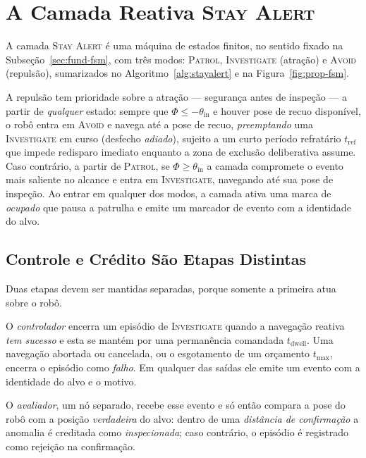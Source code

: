 \section{A Camada Reativa \textsc{Stay Alert}}
\label{sec:prop-stayalert}

A camada \textsc{Stay Alert} é uma máquina de estados finitos, no sentido fixado na
Subseção~\ref{sec:fund-fsm}, com três modos:
\textsc{Patrol}, \textsc{Investigate} (atração) e \textsc{Avoid} (repulsão),
sumarizados no Algoritmo~\ref{alg:stayalert} e na Figura~\ref{fig:prop-fsm}.

A repulsão tem prioridade sobre a atração --- segurança antes de inspeção --- a
partir de \emph{qualquer} estado: sempre que $\Phi \le -\theta_{\text{in}}$ e houver
pose de recuo disponível, o robô entra em \textsc{Avoid} e navega até a pose de
recuo, \emph{preemptando} uma \textsc{Investigate} em curso (desfecho
\emph{adiado}), sujeito a um curto período refratário $t_{\text{ref}}$ que impede
redisparo imediato enquanto a zona de exclusão deliberativa assume. Caso contrário, a
partir de \textsc{Patrol}, se $\Phi \ge \theta_{\text{in}}$ a camada compromete o
evento mais saliente no alcance e entra em \textsc{Investigate}, navegando até sua
pose de inspeção. Ao entrar em qualquer dos modos, a camada ativa uma marca de
\emph{ocupado} que pausa a patrulha e emite um marcador de evento com a identidade do
alvo.

\subsection{Controle e Crédito São Etapas Distintas}
\label{sec:prop-confirmacao}

Duas etapas devem ser mantidas separadas, porque somente a primeira atua sobre o
robô.

O \emph{controlador} encerra um episódio de \textsc{Investigate} quando a navegação
reativa \emph{tem sucesso} e esta se mantém por uma permanência comandada
$t_{\text{dwell}}$. Uma navegação abortada ou cancelada, ou o esgotamento de um
orçamento $t_{\max}$, encerra o episódio como \emph{falho}. Em qualquer das saídas
ele emite um evento com a identidade do alvo e o motivo.

O \emph{avaliador}, um nó separado, recebe esse evento e só então compara a pose do
robô com a posição \emph{verdadeira} do alvo: dentro de uma \emph{distância de
confirmação} a anomalia é creditada como \emph{inspecionada}; caso contrário, o
episódio é registrado como rejeição na confirmação.

